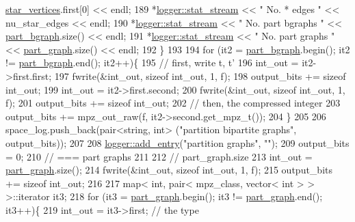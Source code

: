 \begin{DoxyCode}
      \hyperlink{classmarked__graph__compressed_a7a4ced4586e2e353f9076bd447df5208}{star\_vertices}.first[0] << endl;
189     *\hyperlink{classlogger_a7db37821f875f2ba3540980b355779f5}{logger::stat\_stream} << \textcolor{stringliteral}{" No. * edges       "} << nu\_star\_edges << endl;
190     *\hyperlink{classlogger_a7db37821f875f2ba3540980b355779f5}{logger::stat\_stream} << \textcolor{stringliteral}{" No. part bgraphs  "} << 
      \hyperlink{classmarked__graph__compressed_a7b3267063fba30b45eb21b3ba4e07536}{part\_bgraph}.size() << endl;
191     *\hyperlink{classlogger_a7db37821f875f2ba3540980b355779f5}{logger::stat\_stream} << \textcolor{stringliteral}{" No. part graphs   "} << 
      \hyperlink{classmarked__graph__compressed_ae179a4737e6eab905c18a94d44ef64b7}{part\_graph}.size() << endl;
192   \}
193 
194   \textcolor{keywordflow}{for} (it2 = \hyperlink{classmarked__graph__compressed_a7b3267063fba30b45eb21b3ba4e07536}{part\_bgraph}.begin(); it2 != \hyperlink{classmarked__graph__compressed_a7b3267063fba30b45eb21b3ba4e07536}{part\_bgraph}.end(); it2++)\{
195     \textcolor{comment}{// first, write t, t'}
196     int\_out = it2->first.first;
197     fwrite(&int\_out, \textcolor{keyword}{sizeof} int\_out, 1, f);
198     output\_bits += \textcolor{keyword}{sizeof} int\_out;
199     int\_out = it2->first.second;
200     fwrite(&int\_out, \textcolor{keyword}{sizeof} int\_out, 1, f);
201     output\_bits += \textcolor{keyword}{sizeof} int\_out;
202     \textcolor{comment}{// then, the compressed integer}
203     output\_bits += mpz\_out\_raw(f, it2->second.get\_mpz\_t());
204   \}
205 
206   space\_log.push\_back(pair<string, int> (\textcolor{stringliteral}{"partition bipartite graphs"}, output\_bits));
207 
208   \hyperlink{classlogger_a710163deb17bc81f70d53d285b8ac9ac}{logger::add\_entry}(\textcolor{stringliteral}{"partition graphs"}, \textcolor{stringliteral}{""});
209   output\_bits = 0;
210   \textcolor{comment}{// === part graphs}
211 
212   \textcolor{comment}{// part\_graph.size}
213   int\_out = \hyperlink{classmarked__graph__compressed_ae179a4737e6eab905c18a94d44ef64b7}{part\_graph}.size();
214   fwrite(&int\_out, \textcolor{keyword}{sizeof} int\_out, 1, f);
215   output\_bits += \textcolor{keyword}{sizeof} int\_out;
216 
217   map< int, pair< mpz\_class, vector< int > > >::iterator it3;
218   \textcolor{keywordflow}{for} (it3 = \hyperlink{classmarked__graph__compressed_ae179a4737e6eab905c18a94d44ef64b7}{part\_graph}.begin(); it3 != \hyperlink{classmarked__graph__compressed_ae179a4737e6eab905c18a94d44ef64b7}{part\_graph}.end(); it3++)\{
219     int\_out = it3->first; \textcolor{comment}{// the type}

\end{DoxyCode}
